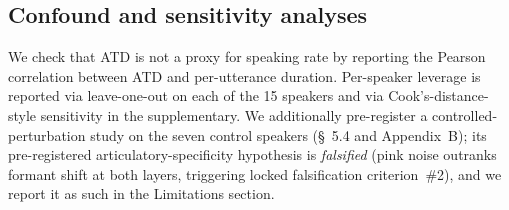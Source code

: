 \subsection{Confound and sensitivity analyses}
We check that ATD is not a proxy for speaking rate by reporting the
Pearson correlation between ATD and per-utterance duration.
Per-speaker leverage is reported via leave-one-out on each of the 15
speakers and via Cook's-distance-style sensitivity in
the supplementary. We additionally pre-register a controlled-perturbation
study on the seven control speakers (\S~5.4 and Appendix~B); its
pre-registered articulatory-specificity hypothesis is \emph{falsified}
(pink noise outranks formant shift at both layers, triggering locked
falsification criterion~\#2), and we report it as such in the Limitations
section.
